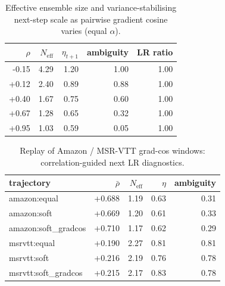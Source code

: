 \begin{table}[t]\centering
\caption{Effective ensemble size and variance-stabilising next-step scale as pairwise gradient cosine varies (equal $\alpha$).}
\label{tab:agod-grad-corr-stat}
\begin{tabular}{rrrrr}\toprule
$\rho$ & $N_{\mathrm{eff}}$ & $\eta_{t+1}$ & ambiguity & LR ratio \\
\midrule
-0.15 & 4.29 & 1.20 & 1.00 & 1.00 \\
+0.12 & 2.40 & 0.89 & 0.88 & 1.00 \\
+0.40 & 1.67 & 0.75 & 0.60 & 1.00 \\
+0.67 & 1.28 & 0.65 & 0.32 & 1.00 \\
+0.95 & 1.03 & 0.59 & 0.05 & 1.00 \\
\bottomrule
\end{tabular}
\end{table}

\begin{table}[t]\centering
\caption{Replay of Amazon / MSR-VTT grad-cos windows: correlation-guided next LR diagnostics.}
\label{tab:agod-grad-corr-replay}
\begin{tabular}{lrrrr}\toprule
trajectory & $\bar\rho$ & $N_{\mathrm{eff}}$ & $\eta$ & ambiguity \\
\midrule
amazon:equal & +0.688 & 1.19 & 0.63 & 0.31 \\
amazon:soft & +0.669 & 1.20 & 0.61 & 0.33 \\
amazon:soft\_gradcos & +0.710 & 1.17 & 0.62 & 0.29 \\
msrvtt:equal & +0.190 & 2.27 & 0.81 & 0.81 \\
msrvtt:soft & +0.216 & 2.19 & 0.76 & 0.78 \\
msrvtt:soft\_gradcos & +0.215 & 2.17 & 0.83 & 0.78 \\
\bottomrule
\end{tabular}
\end{table}
